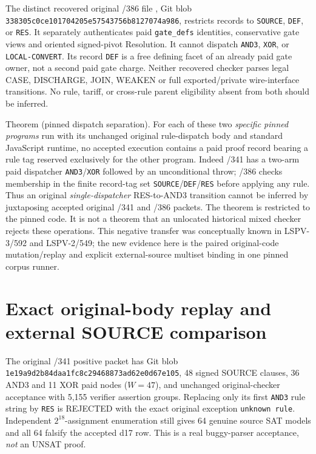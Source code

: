 \documentclass[11pt]{article}
\begin{document}
The distinct recovered original /386 file , Git blob \texttt{338305c0ce101704205e57543756b8127074a986}, restricts records to \texttt{SOURCE}, \texttt{DEF}, or \texttt{RES}. It separately authenticates paid \texttt{gate_defs} identities, conservative gate views and oriented signed-pivot Resolution. It cannot dispatch \texttt{AND3}, \texttt{XOR}, or \texttt{LOCAL-CONVERT}. Its record \texttt{DEF} is a free defining facet of an already paid gate owner, not a second paid gate charge. Neither recovered checker parses legal CASE, DISCHARGE, JOIN, WEAKEN or full exported/private wire-interface transitions. No rule, tariff, or cross-rule parent eligibility absent from both should be inferred.

Theorem (pinned dispatch separation). For each of these two \emph{specific pinned programs} run with its unchanged original rule-dispatch body and standard JavaScript runtime, no accepted execution contains a paid proof record bearing a rule tag reserved exclusively for the other program. Indeed /341 has a two-arm paid dispatcher \texttt{AND3}/\texttt{XOR} followed by an unconditional throw; /386 checks membership in the finite record-tag set \texttt{SOURCE}/\texttt{DEF}/\texttt{RES} before applying any rule. Thus an original \emph{single-dispatcher} RES-to-AND3 transition cannot be inferred by juxtaposing accepted original /341 and /386 packets. The theorem is restricted to the pinned code. It is not a theorem that an unlocated historical mixed checker rejects these operations. This negative transfer was conceptually known in LSPV-3/592 and LSPV-2/549; the new evidence here is the paired original-code mutation/replay and explicit external-source multiset binding in one pinned corpus runner.

\section*{Exact original-body replay and external SOURCE comparison}
The original /341 positive packet
has Git blob \texttt{1e19a9d2b84daa1fc8c29468873ad62e0d67e105}, 48 signed SOURCE clauses, 36 AND3 and 11 XOR paid nodes ($W=47$), and unchanged original-checker acceptance with 5,155 verifier assertion groups. Replacing only its first \texttt{AND3} rule string by \texttt{RES} is REJECTED with the exact original exception \texttt{unknown rule}. Independent $2^{18}$-assignment enumeration still gives 64 genuine source SAT models and all 64 falsify the accepted d17 row. This is a real buggy-parser acceptance, \emph{not} an UNSAT proof.
\end{document}
